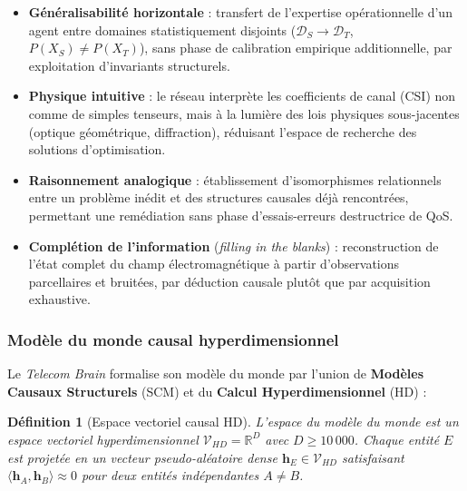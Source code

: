 \documentclass[12pt,a4paper,titlepage]{article}
\newtheorem{definition}{Définition}[section]
\begin{document}
\begin{itemize}[leftmargin=1.5em]
    \item \textbf{Généralisabilité horizontale} : transfert de l'expertise opérationnelle d'un agent entre domaines statistiquement disjoints ($\mathcal{D}_S \to \mathcal{D}_T$, $P(X_S) \neq P(X_T)$), sans phase de calibration empirique additionnelle, par exploitation d'invariants structurels.
    \item \textbf{Physique intuitive} : le réseau interprète les coefficients de canal (CSI) non comme de simples tenseurs, mais à la lumière des lois physiques sous-jacentes (optique géométrique, diffraction), réduisant l'espace de recherche des solutions d'optimisation.
    \item \textbf{Raisonnement analogique} : établissement d'isomorphismes relationnels entre un problème inédit et des structures causales déjà rencontrées, permettant une remédiation sans phase d'essais-erreurs destructrice de QoS.
    \item \textbf{Complétion de l'information} (\textit{filling in the blanks}) : reconstruction de l'état complet du champ électromagnétique à partir d'observations parcellaires et bruitées, par déduction causale plutôt que par acquisition exhaustive.
\end{itemize}

\subsubsection{Modèle du monde causal hyperdimensionnel}

Le \textit{Telecom Brain} formalise son modèle du monde par l'union de \textbf{Modèles Causaux Structurels} (SCM) et du \textbf{Calcul Hyperdimensionnel} (HD) :

\begin{definition}[Espace vectoriel causal HD]
L'espace du modèle du monde est un espace vectoriel hyperdimensionnel $\mathcal{V}_{HD} = \mathbb{R}^D$ avec $D \geq 10\,000$. Chaque entité $E$ est projetée en un vecteur pseudo-aléatoire dense $\mathbf{h}_E \in \mathcal{V}_{HD}$ satisfaisant $\langle \mathbf{h}_A, \mathbf{h}_B \rangle \approx 0$ pour deux entités indépendantes $A \neq B$.
\end{definition}
\end{document}
